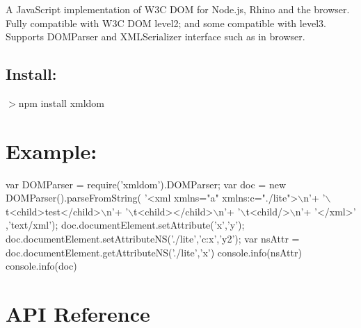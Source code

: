 A Java\+Script implementation of W3C D\+OM for Node.\+js, Rhino and the browser. Fully compatible with {\ttfamily W3C D\+OM level2}; and some compatible with {\ttfamily level3}. Supports {\ttfamily D\+O\+M\+Parser} and {\ttfamily X\+M\+L\+Serializer} interface such as in browser.

\subsection*{Install\+: }

$>$npm install xmldom

\section*{Example\+: }


\begin{DoxyCode}
var DOMParser = require('xmldom').DOMParser;
var doc = new DOMParser().parseFromString(
    '<xml xmlns="a" xmlns:c="./lite">\(\backslash\)n'+
        '\(\backslash\)t<child>test</child>\(\backslash\)n'+
        '\(\backslash\)t<child></child>\(\backslash\)n'+
        '\(\backslash\)t<child/>\(\backslash\)n'+
    '</xml>'
    ,'text/xml');
doc.documentElement.setAttribute('x','y');
doc.documentElement.setAttributeNS('./lite','c:x','y2');
var nsAttr = doc.documentElement.getAttributeNS('./lite','x')
console.info(nsAttr)
console.info(doc)
\end{DoxyCode}
 \section*{A\+PI Reference }


